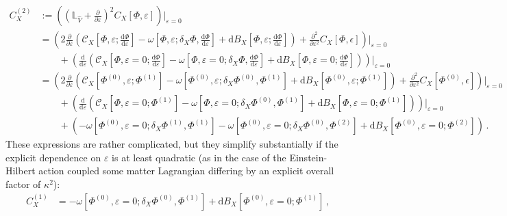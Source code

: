 \documentclass[]{jkpaper}
\theoremstyle{plain}
\theoremstyle{definition}
\newcommand{\sd}{\mathrm {d}}
\def\extd{\mathrm {d}}
\newcommand{\fL}{\mathbb{L}}
\begin{document}
\begin{equation}\begin{split}\label{eq: second order constraint with explicit parameter, general}
     C_{X}^{(2)}&:=\left(\left(\fL_{\hat{V}}+\frac{\partial}{\partial\varepsilon}\right)^2 C_{X}[\Phi,\varepsilon]\right)\bigg|_{\varepsilon=0}\\
     &= \left(2\frac{\partial}{\partial\varepsilon}\left(\mathcal{C}_X\left[\Phi,\varepsilon;\frac{\sd\Phi}{\sd\varepsilon}\right]-\omega\left[\Phi,\varepsilon;\delta_X \Phi,\frac{\extd \Phi}{\extd \varepsilon}\right]+ \sd B_{X}\left[\Phi,\varepsilon; \frac{\extd \Phi}{\extd \varepsilon}\right]\right)
     +\frac{\partial^2}{\partial\varepsilon^2}C_X[\Phi,\epsilon]\right)\bigg|_{\varepsilon=0}\\
     &\qquad+\left(\frac{\sd}{\sd\varepsilon}\left(\mathcal{C}_X\left[\Phi,\varepsilon=0;\frac{\sd\Phi}{\sd\varepsilon}\right]-\omega\left[\Phi,\varepsilon=0;\delta_X \Phi,\frac{\extd \Phi}{\extd \varepsilon}\right]+ \sd B_{X}\left[\Phi,\varepsilon=0; \frac{\extd \Phi}{\extd \varepsilon}\right]\right)\right)\bigg|_{\varepsilon=0}
     \\
     &= \left(2\frac{\partial}{\partial\varepsilon}\left(\mathcal{C}_X\left[\Phi^{(0)},\varepsilon;\Phi^{(1)}\right]-\omega\left[\Phi^{(0)},\varepsilon;\delta_X \Phi^{(0)},\Phi^{(1)}\right]+ \sd B_{X}\left[\Phi^{(0)},\varepsilon; \Phi^{(1)}\right]\right)
     +\frac{\partial^2}{\partial\varepsilon^2}C_X[\Phi^{(0)},\epsilon]\right)\bigg|_{\varepsilon=0}\\
     &\qquad+\left(\frac{\sd}{\sd\varepsilon}\left(\mathcal{C}_X\left[\Phi,\varepsilon=0;\Phi^{(1)}\right]-\omega\left[\Phi,\varepsilon=0;\delta_X \Phi^{(0)},\Phi^{(1)}\right]+ \sd B_{X}\left[\Phi,\varepsilon=0; \Phi^{(1)}\right]\right)\right)\bigg|_{\varepsilon=0}
     \\
     &\qquad+\left(
     -\omega\left[\Phi^{(0)},\varepsilon=0;\delta_X \Phi^{(1)},\Phi^{(1)}\right]
     -\omega\left[\Phi^{(0)},\varepsilon=0;\delta_X \Phi^{(0)},\Phi^{(2)}\right]+ \sd B_{X}\left[\Phi^{(0)},\varepsilon=0; \Phi^{(2)}\right]\right)\,.
\end{split}\end{equation}
These expressions are rather complicated, but they simplify substantially if the explicit dependence on $\varepsilon$ is at least quadratic (as in the case of the Einstein-Hilbert action coupled some matter Lagrangian differing by an explicit overall factor of $\kappa^2$):
\begin{equation}\begin{split}\label{eq: first order constraint, quadratic parameter, general}
     C_{X}^{(1)}&= -\omega\left[\Phi^{(0)},\varepsilon=0;\delta_X\Phi^{(0)}, \Phi^{(1)}\right]+ \sd B_{X}\left[\Phi^{(0)},\varepsilon=0; \Phi^{(1)}\right]\,,
\end{split}\end{equation}
\end{document}
